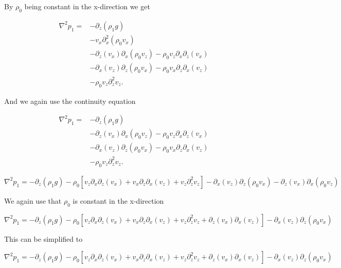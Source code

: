 \documentclass{article}
\begin{document}
By $\rho_0$ being constant in the x-direction we get

\begin{align*}
    \nabla^2 p_1 = &- \partial_z\left(\rho_1 g\right) \\
    &-v_x\partial^2_x (\rho_0 v_x)\\
    &-\partial_z(v_x)\partial_x(\rho_0v_z)-\rho_0v_z \partial_x\partial_z(v_x)\\
    &-\partial_x(v_z)\partial_z(\rho_0v_x)-\rho_0v_x\partial_z\partial_x(v_z)\\
    &-\rho_0v_z\partial^2_z v_z.
\end{align*}

And we again use the continuity equation

\begin{align*}
    \nabla^2 p_1 = &- \partial_z\left(\rho_1 g\right) \\
    &-\partial_z(v_x)\partial_x(\rho_0v_z)-\rho_0v_z \partial_x\partial_z(v_x)\\
    &-\partial_x(v_z)\partial_z(\rho_0v_x)-\rho_0v_x\partial_z\partial_x(v_z)\\
    &-\rho_0v_z\partial^2_z v_z.
\end{align*}


\begin{equation}
    \nabla^2 p_1 = - \partial_z\left(\rho_1 g\right)
    -\rho_0\left[v_z \partial_x\partial_z(v_x)+v_x\partial_z\partial_x(v_z)+v_z\partial^2_z v_z \right]
    -\partial_x(v_z)\partial_z(\rho_0v_x)
    -\partial_z(v_x)\partial_x(\rho_0v_z)
\end{equation}

We again use that $\rho_0$ is constant in the x-direction

\begin{equation}
    \nabla^2 p_1 = - \partial_z\left(\rho_1 g\right)
    -\rho_0\left[v_z \partial_x\partial_z(v_x)+v_x\partial_z\partial_x(v_z)+v_z\partial^2_z v_z+\partial_z(v_x)\partial_x(v_z) \right]
    -\partial_x(v_z)\partial_z(\rho_0v_x)
\end{equation}

This can be simplified to

\begin{equation}
    \nabla^2 p_1 = - \partial_z\left(\rho_1 g\right)
    -\rho_0\left[v_z \partial_x\partial_z(v_x)+v_x\partial_z\partial_x(v_z)+v_z\partial^2_z v_z+\partial_z(v_x)\partial_x(v_z) \right]
    -\partial_x(v_z)\partial_z(\rho_0v_x)
\end{equation}
\end{document}
